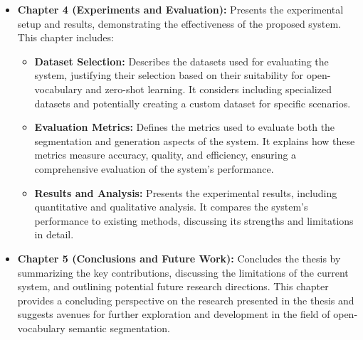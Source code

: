 \begin{itemize}
\item \textbf{Chapter 4 (Experiments and Evaluation):} Presents the experimental setup and results, demonstrating the effectiveness of the proposed system. This chapter includes:
\begin{itemize}
\item \textbf{Dataset Selection:} Describes the datasets used for evaluating the system, justifying their selection based on their suitability for open-vocabulary and zero-shot learning. It considers including specialized datasets and potentially creating a custom dataset for specific scenarios.
\item \textbf{Evaluation Metrics:} Defines the metrics used to evaluate both the segmentation and generation aspects of the system. It explains how these metrics measure accuracy, quality, and efficiency, ensuring a comprehensive evaluation of the system's performance.
\item \textbf{Results and Analysis:} Presents the experimental results, including quantitative and qualitative analysis. It compares the system's performance to existing methods, discussing its strengths and limitations in detail.
\end{itemize}

\item \textbf{Chapter 5 (Conclusions and Future Work):} Concludes the thesis by summarizing the key contributions, discussing the limitations of the current system, and outlining potential future research directions. This chapter provides a concluding perspective on the research presented in the thesis and suggests avenues for further exploration and development in the field of open-vocabulary semantic segmentation.
\end{itemize}